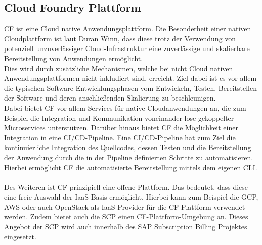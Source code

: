 \subsection{Cloud Foundry Plattform}
\acl{CF} ist eine Cloud native Anwendungsplattform. Die Besonderheit einer nativen Cloudplattform ist laut Duran Winn, dass diese trotz der Verwendung von potenziell unzuverlässiger Cloud-Infrastruktur eine zuverlässige und skalierbare Bereitstellung von Anwendungen ermöglicht.\autocite[Vgl.][S. 1]{Winn.2017}\\
Dies wird durch zusätzliche Mechanismen, welche bei nicht Cloud nativen Anwendungsplattformen nicht inkludiert sind, erreicht. Ziel dabei ist es vor allem die typischen Software-Entwicklungsphasen vom Entwickeln, Testen, Bereitstellen der Software und deren anschließenden Skalierung zu beschleunigen.\autocite[Vgl.][You Need a Cloud-Native Platform, Not a PaaS - Cloud-Native Platforms]{Winn.2016} \\
Dabei bietet \ac{CF} vor allem Services für native Cloudanwendungen an, die zum Beispiel die Integration und Kommunikation voneinander lose gekoppelter Microservices unterstützen. Darüber hinaus bietet \ac{CF} die Möglichkeit einer Integration in eine \ac{CI}/\ac{CD}-Pipeline. Eine \ac{CI}/\ac{CD}-Pipeline hat zum Ziel die kontinuierliche Integration des Quellcodes, dessen Testen und die Bereitstellung der Anwendung durch die in der Pipeline definierten Schritte zu automatisieren. Hierbei ermöglicht \ac{CF} die automatisierte Bereitstellung mittels dem eigenen \ac{CLI}.\autocite[Vgl.][S. 7-8]{Winn.2017}\\\\
Des Weiteren ist \ac{CF} prinzipiell eine offene Plattform. Das bedeutet, dass diese eine freie Auswahl der \ac{IaaS}-Basis ermöglicht. Hierbei kann zum Beispiel die \ac{GCP}, \ac{AWS} oder auch OpenStack als \ac{IaaS}-Provider für die \ac{CF}-Plattform verwendet werden. Zudem bietet auch die \ac{SCP} einen \ac{CF}-Plattform-Umgebung an. Dieses Angebot der \ac{SCP} wird auch innerhalb des SAP Subscription Billing Projektes eingesetzt.
\autocite[Vgl.][S. 5, 49]{Winn.2017}
\\
